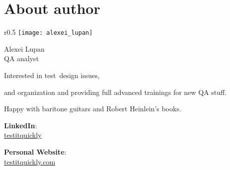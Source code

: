 \section*{About author}
\label{sec:About author}

\begingroup

	
	

\setlength{\intextsep}{-0.3em}
\setlength{\columnsep}{3em}

\begin{wrapfigure}[5]{r}{0.5\linewidth}
  \centering\texttt{[image: alexei\_lupan]}
\end{wrapfigure}

{\Large Alexei Lupan}\\
QA analyst

\setlength{\leftskip}{0.6em}

Interested in \mbox{test design} issues, 

and organization and providing full advanced trainings for new QA stuff.

Happy with baritone guitars and Robert Heinlein's books.                                                                                                                                                                                                    

\setlength{\leftskip}{0em}

\textbf{LinkedIn}:\\
\href{https://www.linkedin.com/in/testitquickly/}{testitquickly}

\textbf{Personal Website}:\\
\href{https://testitquickly.com/}{testitquickly.com}

\endgroup
